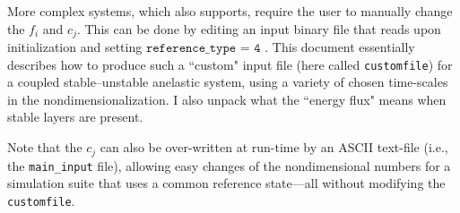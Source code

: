 \documentclass[12pt]{article}
\numberwithin{equation}{section}
\begin{document}
More complex systems, which {\rayleigh} also supports, require the user to manually change the $f_i$ and $c_j$. This can be done by editing an input binary file that {\rayleigh} reads upon initialization and setting $\texttt{reference\_type = 4}$ . This document essentially describes how to produce such a ``custom" input file (here called {\texttt{customfile}}) for a coupled stable--unstable anelastic system, using a variety of chosen time-scales in the nondimensionalization. I also unpack what the ``energy flux" means when stable layers are present. 

Note that the $c_j$ can also be over-written at run-time by an ASCII text-file (i.e., the \texttt{main\_input} file), allowing easy changes of the nondimensional numbers for a simulation suite that uses a common reference state---all without modifying the  {\texttt{customfile}}.
	
\end{document}
